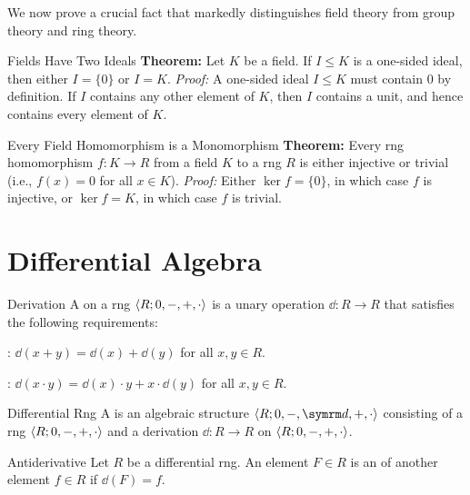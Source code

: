 \documentclass[12pt]{report}
\begin{document}
We now prove a crucial fact that markedly distinguishes field theory from group theory and ring theory.

\begin{thmbox}{Fields Have Two Ideals}
	\textbf{Theorem:} Let $K$ be a field. If $I \le K$ is a one-sided ideal, then either $I = \{0\}$ or $I = K$.
\tcblower
	\textit{Proof:} A one-sided ideal $I \le K$ must contain $0$ by definition. If $I$ contains any other element of $K$, then $I$ contains a unit, and hence contains every element of $K$.
\end{thmbox}

\begin{thmbox}{Every Field Homomorphism is a Monomorphism}
	\textbf{Theorem:} Every rng homomorphism $f: K \to R$ from a field $K$ to a rng $R$ is either injective or trivial (i.e., $f(x) = 0$ for all $x \in K$).
\tcblower
	\textit{Proof:} Either $\ker f = \{0\}$, in which case $f$ is injective, or $\ker f = K$, in which case $f$ is trivial.
\end{thmbox}



\chapter{Differential Algebra}

\begin{dfnbox}{Derivation}
	A  on a rng ${\langle {R; 0, -, +, \cdot} \rangle}$ is a unary operation $\dd: R \to R$ that satisfies the following requirements:
	\begin{dfnitems}
		\item {}: $\dd(x + y) = \dd(x) + \dd(y)$ for all $x, y \in R$.
		\item {}: $\dd(x \cdot y) = \dd(x) \cdot y + x \cdot \dd(y)$ for all $x, y \in R$.
	\end{dfnitems}
\end{dfnbox}

\begin{dfnbox}{Differential Rng}
	A  is an algebraic structure $\alg{R; 0, -, \dd, +, \cdot}$ consisting of a rng ${\langle {R; 0, -, +, \cdot} \rangle}$ and a derivation $\dd: R \to R$ on ${\langle {R; 0, -, +, \cdot} \rangle}$.
\end{dfnbox}

\begin{dfnbox}{Antiderivative}
	Let $R$ be a differential rng. An element $F \in R$ is an  of another element $f \in R$ if $\dd(F) = f$.
\end{dfnbox}
\end{document}
